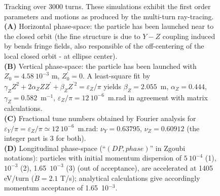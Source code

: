 \begin{figure}[H]
\begin{center}
\vspace{-15mm}
\caption[FigC62]{\label{figC62} \small
Tracking  over 3000 turns. These 
simulations exhibit the first order parameters and 
motions as produced by the multi-turn ray-tracing. \\
\textbf{(A)} Horizontal phase-space: the particle has been launched near to 
the  closed orbit (the fine structure is due to $Y-Z$ coupling induced by bends fringe fields, also 
responsible of the off-centering of the local closed orbit - at ellipse center). \\
\textbf{(B)} Vertical phase-space: the particle has been launched with 
$Z_0=4.58\ 10^{-3} $ m, $ Z^{\prime}_ 0=0$.  A least-square fit by 
$ \gamma_ZZ^2+2\alpha_ ZZZ^\prime +\beta_ ZZ^{^\prime 2}=\varepsilon_ Z/\pi $ 
 yields $ \beta_ Z=2.055 $~m, $ \alpha_Z=0.444$, $ \gamma_Z=0.582$~m$ ^{-1} $,  $ \varepsilon_Z/\pi =12\ 10^{-6}$~m.rad
 in agreement with  matrix calculations. \\
\textbf{(C)} Fractional tune numbers obtained by Fourier analysis 
for $ \varepsilon_ Y/\pi =\varepsilon_ Z/\pi \simeq 12\ 10^{-6} $~m.rad: 
$\nu_ Y=0.63795$,  $ \nu_ Z=0.60912 $ (the integer part is 3 for both). \\
\textbf{(D)} Longitudinal phase-space (``$(DP, phase)$'' in Zgoubi notations): particles with initial momentum dispersion 
of $ 5\ 10^{-4} $ (1), $ 10^{-3} $ (2),
1.65~$ 10^{-3}$ (3) (out of acceptance), are accelerated at 1405 eV/turn 
($\dot  B=2.1 $ T/s); analytical calculations give accordingly 
momentum acceptance of 1.65~10$^{-3} $. }
\end{center}

\end{figure}

\vfill

